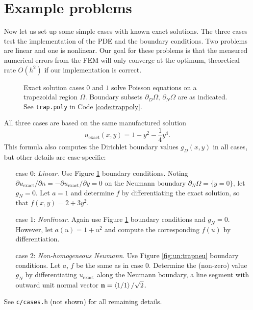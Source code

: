 \section{Example problems}

Now let us set up some simple cases with known exact solutions.  The three cases test the implementation of the PDE and the boundary conditions.  Two problems are linear and one is nonlinear.  Our goal for these problems is that the measured numerical errors from the FEM will only converge at the optimum, theoretical rate $O(h^2)$ \citep{Elmanetal2005} if our implementation is correct.

\begin{figure}

\caption{Exact solution cases $0$ and $1$ solve Poisson equations on a trapezoidal region $\Omega$.  Boundary subsets $\partial_D\Omega$, $\partial_N \Omega$ are as indicated.  See \texttt{trap.poly} in Code \ref{code:trappoly}.}
\label{fig:un:trap}
\end{figure}

All three cases are based on the same manufactured solution
\begin{equation}
  u_{\text{exact}}(x,y) = 1 - y^2 - \frac{1}{4} y^4. \label{eq:un:exactsolution}
\end{equation}
This formula also computes the Dirichlet boundary values $g_D(x,y)$ in all cases, but other details are case-specific:
\begin{itemize}
\item[case $0$:] \emph{Linear}.  Use Figure \ref{fig:un:trap} boundary conditions.  Noting $\partial u_{\text{exact}}/\partial n = -\partial u_{\text{exact}}/\partial y = 0$ on the Neumann boundary $\partial_N \Omega = \{y=0\}$, let $g_N=0$.  Let $a=1$ and determine $f$ by differentiating the exact solution, so that $f(x,y) = 2 + 3 y^2$.
\item[case $1$:] \emph{Nonlinear}.  Again use Figure \ref{fig:un:trap} boundary conditions and $g_N=0$.  However, let $a(u) = 1+u^2$ and compute the corresponding $f(u)$ by differentiation.
\item[case $2$:] \emph{Non-homogeneous Neumann}.  Use Figure \ref{fig:un:trapneu} boundary conditions.  Let $a$, $f$ be the same as in case $0$.  Determine the (non-zero) value $g_N$ by differentiating $u_{\text{exact}}$ along the Neumann boundary, a line segment with outward unit normal vector $\mathbf{n} = \left<1/1\right>/\sqrt{2}$.
\end{itemize}
See \texttt{c/\CODELOC cases.h} (not shown) for all remaining details.


